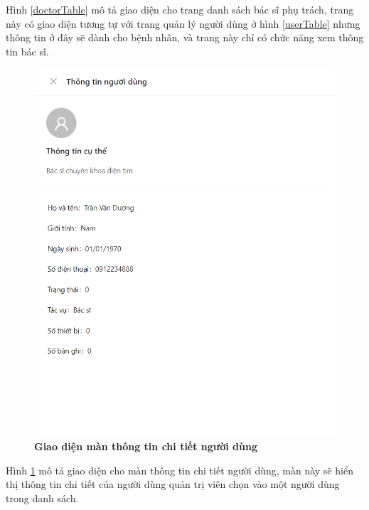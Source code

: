 Hình \ref{doctorTable} mô tả giao diện cho trang danh sách bác sĩ phụ trách, trang này có giao diện tương tự với trang 
quản lý người dùng ở hình \ref{userTable} nhưng thông tin ở đây sẽ dành cho bệnh nhân, và trang này chỉ có chức năng xem thông tin bác sĩ.

\begin{figure}[H]
  \centering
  \includegraphics[scale=0.7]{Images/server/webUI/userInfo.png}
  \caption[Giao diện màn thông tin chi tiết người dùng]{\bfseries \fontsize{12pt}{0pt}\selectfont Giao diện màn thông tin chi tiết người dùng}
  \label{userInfo} %
\end{figure}

Hình \ref{userInfo} mô tả giao diện cho màn thông tin chi tiết người dùng, màn này sẽ hiển thị thông tin
chi tiết của người dùng quản trị viên chọn vào một người dùng trong danh sách.


